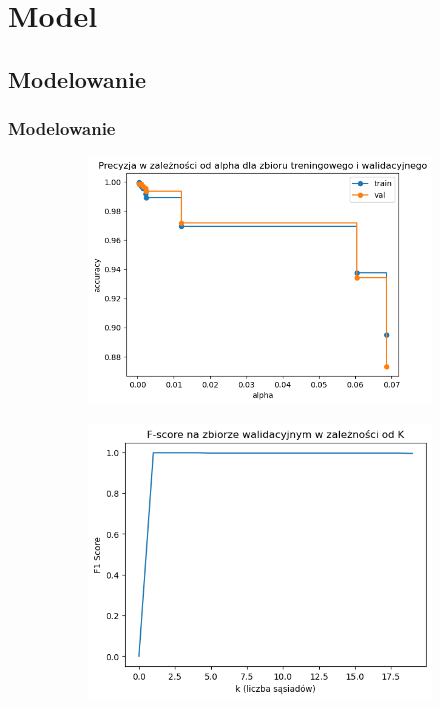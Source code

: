 \documentclass{beamer}
\begin{document}
	\section{Model}
	\subsection{Modelowanie}
\begin{frame}
	\frametitle{Modelowanie}
	\begin{figure}
		\begin{subfigure}[b]{0.49\textwidth}
			\includegraphics[width=\linewidth]{ModelowanieTree.png}
		\end{subfigure}
		\begin{subfigure}[b]{0.49\textwidth}
			\includegraphics[width=\linewidth]{ModelowanieKNN.png}
		\end{subfigure}
	\end{figure}
\end{frame}
\end{document}
